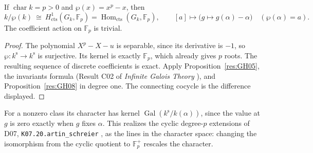 \begin{theorem}
\label{res:GH09}
If \(\operatorname{char}k=p>0\) and \(\wp(x)=x^p-x\), then
\[
 k/\wp(k)
   \ \cong\ H^1_{\mathrm{cts}}(G_k,\mathbb F_p)
   =\operatorname{Hom}_{\mathrm{cts}}(G_k,\mathbb F_p),
 \qquad
 [a]\longmapsto \bigl(g\mapsto g(\alpha)-\alpha\bigr)
 \quad(\wp(\alpha)=a).
\]
The coefficient action on \(\mathbb F_p\) is trivial.
\end{theorem}
\begin{proof}
The polynomial \(X^p-X-u\) is separable, since its derivative is
\(-1\), so \(\wp:k^{\mathrm s}\to k^{\mathrm s}\) is surjective.
Its kernel is exactly \(\mathbb F_p\), which already gives \(p\)
roots. The resulting sequence of discrete coefficients is exact.
Apply Proposition~\ref{res:GH05}, the invariants formula
(Result C02 of \emph{Infinite Galois Theory}
\cite[PDF p.~12]{mg-aft}), and Proposition~\ref{res:GH08} in
degree one. The connecting cocycle is the difference displayed.
\end{proof}

For a nonzero class its character has kernel
\(\operatorname{Gal}(k^{\mathrm s}/k(\alpha))\), since the value at
\(g\) is zero exactly when \(g\) fixes \(\alpha\). This realizes
the cyclic degree-\(p\) extensions of D07,
\texttt{K07.20.artin\_schreier} \cite[PDF p.~172]{mg-d07},
as the lines in the character space: changing the isomorphism from
the cyclic quotient to \(\mathbb F_p^+\) rescales the character.

